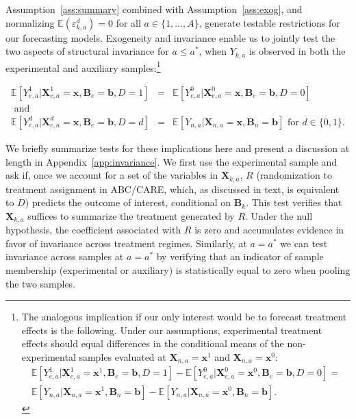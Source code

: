 \noindent Assumption~\ref{ass:summary} combined with Assumption~\ref{ass:exog}, and normalizing $\mathbb{E}(\varepsilon^d_{k,a})=0$ for all $a \in \{1,\dots,A\}$, generate testable restrictions for our forecasting models. Exogeneity and invariance enable us to jointly test the two aspects of structural invariance for $a \leq a^*$, when $Y_{k,a}$ is observed in both the experimental and auxiliary samples:\footnote{The analogous implication if our only interest would be to forecast treatment effects is the following. Under our assumptions, experimental treatment effects should equal differences in the conditional means of the non-experimental samples evaluated at $\bm{X}_{n,a} = \bm{x}^1$ and  $\bm{X}_{n,a} = \bm{x}^0$:
\begin{eqnarray}
\mathbb{E} \left[ Y_{e,a}^1 |  \bm{X}_{e,a}^1 = \bm{x}^1, \bm{B}_e = \bm{b}, D = 1 \right] - \mathbb{E} \left[ Y_{e,a}^0 |  \bm{X}_{e,a}^0 = \bm{x}^0, \bm{B}_e = \bm{b}, D = 0 \right] = \nonumber \\
\mathbb{E} \left[ Y_{n,a} | \bm{X}_{n,a} = \bm{x}^1, \bm{B}_n = \bm{b} \right] - \mathbb{E} \left[ Y_{n,a} | \bm{X}_{n,a} = \bm{x}^0, \bm{B}_n = \bm{b} \right].
\end{eqnarray}}

\begin{eqnarray}
\mathbb{E} \left[ Y_{e,a}^1 | \bm{X}_{e,a}^1 = \bm{x}, \bm{B}_{e} = \bm{b}, D = 1   \right] &=&  \mathbb{E} \left[ Y_{e,a}^0 | \bm{X}_{e,a}^0 = \bm{x}, \bm{B}_{e} = \bm{b}, D = 0   \right]  \\
\text{ and} & \nonumber \\
\mathbb{E} \left[ Y_{e,a}^d | \bm{X}_{e,a}^d = \bm{x}, \bm{B}_{e} = \bm{b}, D = d   \right] &=&  \mathbb{E} \left[ Y_{n,a} | \bm{X}_{n,a} = \bm{x}, \bm{B}_{n} = \bm{b} \right] \text{ for }  d \in \{0,1\}.
\end{eqnarray}

\noindent We briefly summarize tests for these implications here and present a discussion at length in Appendix~\ref{app:invariance}. We first use the experimental sample and ask if, once we account for a set of the variables in $\bm{X}_{k,a}$, $R$ (randomization to treatment assignment in ABC/CARE, which, as discussed in text, is equivalent to $D$) predicts the outcome of interest, conditional on $\bm{B}_k$. This test verifies that $\bm{X}_{k,a}$ suffices to summarize the treatment generated by $R$. Under the null hypothesis, the coefficient associated with $R$ is zero and accumulates evidence in favor of invariance across treatment regimes. Similarly, at $a = a^*$ we can test invariance across samples at $a = a^*$ by verifying that an indicator of sample membership (experimental or auxiliary) is statistically equal to zero when pooling the two samples.\\

